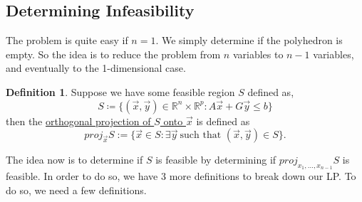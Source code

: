 \documentclass[11pt]{article}
\theoremstyle{definition}
\newtheorem{definition}{Definition}[subsection]
\theoremstyle{definition}
\theoremstyle{definition}
\theoremstyle{remark}
\newcommand{\vectorproj}[2][]{\textit{proj}_{#1}#2}
\newcommand{\R}{\mathbb{R}}
\begin{document}
\subsection{Determining Infeasibility}
The problem is quite easy if $n=1$. We simply determine if the polyhedron is
empty. So the idea is to reduce the problem from $n$ variables to $n-1$
variables, and eventually to the 1-dimensional case.
\begin{definition}
Suppose we have some feasible region $S$ defined as,
\begin{equation*}
S \coloneqq \{(\vec x, \vec y) \in \R^n \times \R^p: A\vec x + G\vec y \leq b\}
\end{equation*}
then the \underline{orthogonal projection of $S$ onto $\vec x$} is defined as
\begin{equation*}
\vectorproj[\vec x]{S} := \{\vec x \in S: \exists \vec y\> \text{such that }
(\vec x, \vec y) \in S\}.
\end{equation*}
\end{definition}
The idea now is to determine if $S$ is feasible by determining if
$\vectorproj[x_1,\dots,x_{n-1}]{S}$ is feasible. In order to do so, we have 3
more definitions to break down our LP\@. To do so, we need a few definitions.\\
\end{document}
